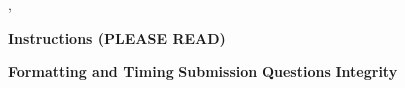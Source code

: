 \vspace*{-1cm}

\begin{center}
{\Large \TestName, \Course }
\end{center}



\vspace{2pt}
\begin{center}\textbf{{\large Instructions (PLEASE READ)}}\end{center}
\textbf{Formatting and Timing}
{\small \InstructionsFormatAndTiming}
\textbf{Submission}
{\small \InstructionsSubmission}
\textbf{Questions}
{\small \InstructionsQuestions}
\textbf{Integrity}
{\small \InstructionsHonor}

